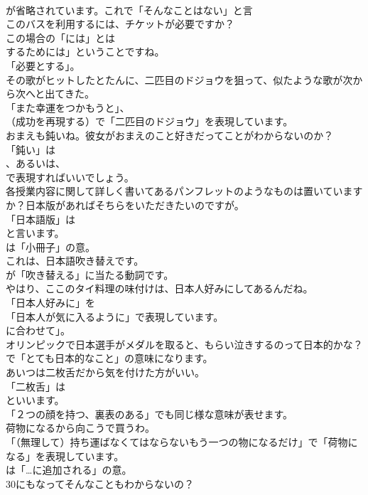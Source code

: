 \documentclass[8pt]{extreport}
\begin{document}
\begin{CJK}{UTF8}{min}
\\	が省略されています。これで「そんなことはない」と言	
\\	このバスを利用するには、チケットが必要ですか？ 
\\	この場合の「には」とは
\\	するためには」ということですね。
\\	「必要とする」。	
\\	その歌がヒットしたとたんに、二匹目のドジョウを狙って、似たような歌が次から次へと出てきた。 
\\	「また幸運をつかもうと」、
\\	（成功を再現する）で「二匹目のドジョウ」を表現しています。	
\\	おまえも鈍いね。彼女がおまえのこと好きだってことがわからないのか？ 
\\	「鈍い」は 
\\	、あるいは、
\\	で表現すればいいでしょう。	
\\	各授業内容に関して詳しく書いてあるパンフレットのようなものは置いていますか？日本版があればそちらをいただきたいのですが。 
\\	「日本語版」は 
\\	と言います。
\\	は「小冊子」の意。	
\\	これは、日本語吹き替えです。 
\\	が「吹き替える」に当たる動詞です。	
\\	やはり、ここのタイ料理の味付けは、日本人好みにしてあるんだね。 
\\	「日本人好みに」を
\\	「日本人が気に入るように」で表現しています。
\\	に合わせて」。	
\\	オリンピックで日本選手がメダルを取ると、もらい泣きするのって日本的かな？ 
\\	で「とても日本的なこと」の意味になります。	
\\	あいつは二枚舌だから気を付けた方がいい。 
\\	「二枚舌」は
\\	といいます。
\\	「２つの顔を持つ、裏表のある」でも同じ様な意味が表せます。	
\\	荷物になるから向こうで買うわ。 
\\	「（無理して）持ち運ばなくてはならないもう一つの物になるだけ」で「荷物になる」を表現しています。
\\	は「…に追加される」の意。	
\\	30にもなってそんなこともわからないの？ 

\end{CJK}
\end{document}
